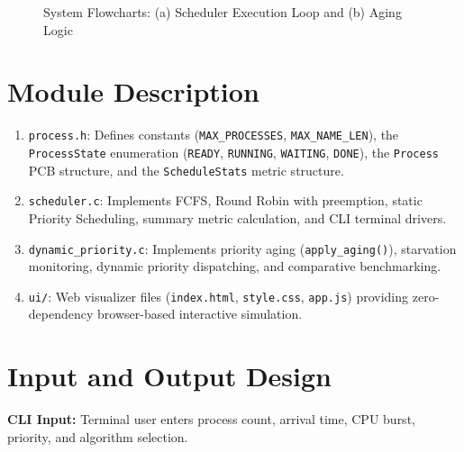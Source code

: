\documentclass[12pt,a4paper]{report}
\begin{document}
\begin{figure}[H]
\begin{minipage}[t]{0.48\textwidth}
\end{minipage}
\caption{System Flowcharts: (a) Scheduler Execution Loop and (b) Aging Logic}
\label{fig:flowcharts}
\end{figure}

\section{Module Description}
\begin{enumerate}[leftmargin=1.8em, itemsep=2pt]
  \item \texttt{process.h}: Defines constants (\texttt{MAX\_PROCESSES}, \texttt{MAX\_NAME\_LEN}), the \texttt{ProcessState} enumeration (\texttt{READY}, \texttt{RUNNING}, \texttt{WAITING}, \texttt{DONE}), the \texttt{Process} PCB structure, and the \texttt{ScheduleStats} metric structure.
  \item \texttt{scheduler.c}: Implements FCFS, Round Robin with preemption, static Priority Scheduling, summary metric calculation, and CLI terminal drivers.
  \item \texttt{dynamic_priority.c}: Implements priority aging (\texttt{apply\_aging()}), starvation monitoring, dynamic priority dispatching, and comparative benchmarking.
  \item \texttt{ui/}: Web visualizer files (\texttt{index.html}, \texttt{style.css}, \texttt{app.js}) providing zero-dependency browser-based interactive simulation.
\end{enumerate}

\section{Input and Output Design}
\textbf{CLI Input:} Terminal user enters process count, arrival time, CPU burst, priority, and algorithm selection.
\end{document}

